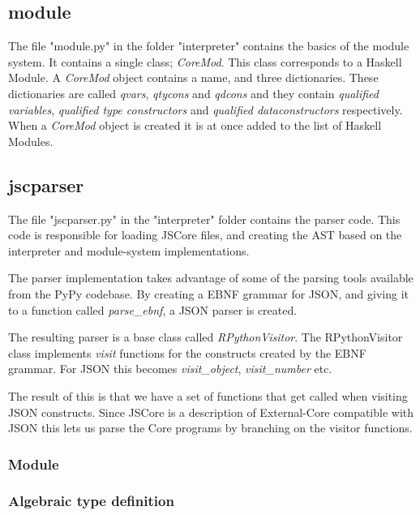 \subsection{module}

The file "module.py" in the folder "interpreter" contains the basics of the
module system. It contains a single class; \emph{CoreMod}. This class corresponds
to a Haskell Module. A \emph{CoreMod} object contains a name, and three dictionaries.
These dictionaries are called \emph{qvars}, \emph{qtycons} and \emph{qdcons} and they
contain \emph{qualified variables}, \emph{qualified type constructors} and 
\emph{qualified dataconstructors} respectively. When a \emph{CoreMod} object is created
it is at once added to the list of Haskell Modules.

\subsection{jscparser}

The file "jscparser.py" in the "interpreter" folder contains the parser code. 
This code is responsible for loading JSCore files, and creating the AST based 
on the interpreter and module-system implementations.

The parser implementation takes advantage of some of the parsing tools 
available from
the PyPy codebase. By creating a EBNF grammar for JSON, and giving it to a 
function called \emph{parse\_ebnf}, a JSON parser is created.

The resulting parser is a base class called \emph{RPythonVisitor}. The 
RPythonVisitor
class implements \emph{visit} functions for the constructs created by the 
EBNF grammar. For JSON this becomes \emph{visit\_object}, 
\emph{visit\_number} etc.

The result of this is that we have a set of functions that get called when 
visiting JSON constructs. Since JSCore is a description of External-Core 
compatible with JSON this lets us parse the Core programs by branching 
on the visitor functions.

\subsubsection{Module}


\subsubsection{Algebraic type definition}



